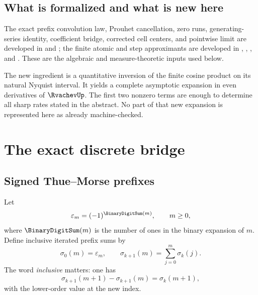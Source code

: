 \documentclass[11pt,oneside]{article}
\theoremstyle{definition}
\theoremstyle{remark}
\begin{document}
\subsection{What is formalized and what is new here}

The exact prefix convolution law, Prouhet cancellation, zero runs, generating-series identity,
coefficient bridge, corrected cell centers, and pointwise limit are developed in
 and ; the finite atomic and step
approximants are developed in ,
, , and
 \cite{tmrates:proveit}.  These are the algebraic and
measure-theoretic inputs used below.

The new ingredient is a quantitative inversion of the finite cosine product on its natural
Nyquist interval.  It yields a complete asymptotic expansion in even derivatives of $\RvachevUp$.
The first two nonzero terms are enough to determine all sharp rates stated in the abstract.
No part of that new expansion is represented here as already machine-checked.

\section{The exact discrete bridge}
\label{tmrates:sec:bridge}

\subsection{Signed Thue--Morse prefixes}

Let
\begin{equation}
 \varepsilon_m=(-1)^{\BinaryDigitSum(m)},\qquad m\ge0,                 \label{tmrates:eq:tm-sign}
\end{equation}
where $\BinaryDigitSum(m)$ is the number of ones in the binary expansion of $m$.  Define inclusive
iterated prefix sums by
\begin{equation}
 \sigma_0(m)=\varepsilon_m,
 \qquad
 \sigma_{k+1}(m)=\sum_{j=0}^{m}\sigma_k(j).                \label{tmrates:eq:prefix-def}
\end{equation}
The word \emph{inclusive} matters: one has
\begin{equation}
 \sigma_{k+1}(m+1)-\sigma_{k+1}(m)=\sigma_k(m+1),          \label{tmrates:eq:forward-difference}
\end{equation}
with the lower-order value at the new index.
\end{document}
